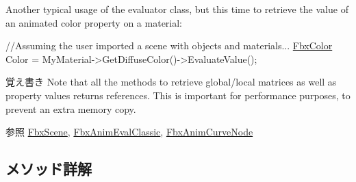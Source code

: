 Another typical usage of the evaluator class, but this time to retrieve the value of an animated color property on a material\+: 
\begin{DoxyCode}
\textcolor{comment}{//Assuming the user imported a scene with objects and materials...}
\hyperlink{class_fbx_color}{FbxColor} Color = MyMaterial->GetDiffuseColor()->EvaluateValue();
\end{DoxyCode}


\begin{DoxyNote}{覚え書き}
Note that all the methods to retrieve global/local matrices as well as property values returns references. This is important for performance purposes, to prevent an extra memory copy. 
\end{DoxyNote}
\begin{DoxySeeAlso}{参照}
\hyperlink{class_fbx_scene}{Fbx\+Scene}, \hyperlink{class_fbx_anim_eval_classic}{Fbx\+Anim\+Eval\+Classic}, \hyperlink{class_fbx_anim_curve_node}{Fbx\+Anim\+Curve\+Node} 
\end{DoxySeeAlso}


\subsection{メソッド詳解}
\mbox{\label{class_fbx_anim_evaluator_a7ffe74bd370dfef23e5c1dd88b334e3d}} 
